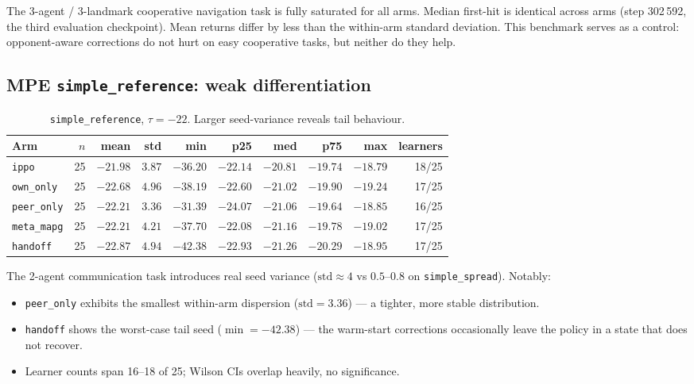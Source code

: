 \documentclass[11pt,a4paper]{article}
\newcommand{\arm}[1]{\texttt{#1}}
\newcommand{\thr}{\tau}
\begin{document}
The 3-agent / 3-landmark cooperative navigation task is fully saturated for all arms.
Median first-hit is identical across arms (step 302\,592, the third evaluation checkpoint).
Mean returns differ by less than the within-arm standard deviation.
This benchmark serves as a control: opponent-aware corrections do not hurt on easy cooperative tasks, but neither do they help.

\subsection{MPE \texttt{simple\_reference}: weak differentiation}

\begin{table}[h]
\centering
\caption{\texttt{simple\_reference}, $\thr = -22$. Larger seed-variance reveals tail behaviour.}
\label{tab:reference}
\small
\begin{tabular}{lrrrrrrrrr}
\toprule
\textbf{Arm} & $n$ & \textbf{mean} & \textbf{std} & \textbf{min} & \textbf{p25} & \textbf{med} & \textbf{p75} & \textbf{max} & \textbf{learners} \\
\midrule
\arm{ippo}      & 25 & $-21.98$ & $3.87$ & $-36.20$ & $-22.14$ & $-20.81$ & $-19.74$ & $-18.79$ & 18/25 \\
\arm{own\_only} & 25 & $-22.68$ & $4.96$ & $-38.19$ & $-22.60$ & $-21.02$ & $-19.90$ & $-19.24$ & 17/25 \\
\arm{peer\_only}& 25 & $-22.21$ & $\mathbf{3.36}$ & $-31.39$ & $-24.07$ & $-21.06$ & $-19.64$ & $-18.85$ & 16/25 \\
\arm{meta\_mapg}& 25 & $-22.21$ & $4.21$ & $-37.70$ & $-22.08$ & $-21.16$ & $-19.78$ & $-19.02$ & 17/25 \\
\arm{handoff}   & 25 & $-22.87$ & $4.94$ & $-42.38$ & $-22.93$ & $-21.26$ & $-20.29$ & $-18.95$ & 17/25 \\
\bottomrule
\end{tabular}
\end{table}

The 2-agent communication task introduces real seed variance ($\text{std} \approx 4$ vs $0.5$--$0.8$ on \texttt{simple\_spread}).
Notably:
\begin{itemize}
    \item \arm{peer\_only} exhibits the smallest within-arm dispersion ($\text{std} = 3.36$) --- a tighter, more stable distribution.
    \item \arm{handoff} shows the worst-case tail seed ($\min = -42.38$) --- the warm-start corrections occasionally leave the policy in a state that does not recover.
    \item Learner counts span 16--18 of 25; Wilson CIs overlap heavily, no significance.
\end{itemize}
\end{document}
